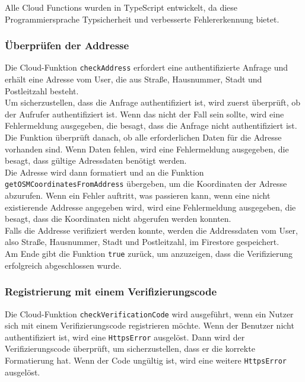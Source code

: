Alle Cloud Functions wurden in TypeScript entwickelt, da diese Programmiersprache Typsicherheit und verbesserte Fehlererkennung bietet.

\subsubsection{Überprüfen der Addresse}

Die Cloud-Funktion \texttt{checkAddress} erfordert eine authentifizierte Anfrage und erhält eine Adresse vom User, die aus Straße, Hausnummer, Stadt und Postleitzahl besteht.
\\
Um sicherzustellen, dass die Anfrage authentifiziert ist, wird zuerst überprüft, ob der Aufrufer authentifiziert ist. Wenn das nicht der Fall sein sollte, wird eine Fehlermeldung ausgegeben, die besagt, dass die Anfrage nicht authentifiziert ist.
\\
Die Funktion überprüft danach, ob alle erforderlichen Daten für die Adresse vorhanden sind. Wenn Daten fehlen, wird eine Fehlermeldung ausgegeben, die besagt, dass gültige Adressdaten benötigt werden.
\\
Die Adresse wird dann formatiert und an die Funktion \texttt{getOSMCoordinatesFromAddress} übergeben, um die Koordinaten der Adresse abzurufen. Wenn ein Fehler auftritt, was passieren kann, wenn eine nicht existierende Addresse angegeben wird, wird eine Fehlermeldung ausgegeben, die besagt, dass die Koordinaten nicht abgerufen werden konnten.
\\
Falls die Addresse verifiziert werden konnte, werden die Addressdaten vom User, also Straße, Hausnummer, Stadt und Postleitzahl, im Firestore gespeichert.
\\
Am Ende gibt die Funktion \texttt{true} zurück, um anzuzeigen, dass die Verifizierung erfolgreich abgeschlossen wurde.

\subsubsection{Registrierung mit einem Verifizierungscode}\label{subsec:registrierung-verify}

Die Cloud-Funktion \texttt{checkVerificationCode} wird ausgeführt, wenn ein Nutzer sich mit einem Verifizierungscode registrieren möchte. Wenn der Benutzer nicht authentifiziert ist, wird eine \texttt{HttpsError} ausgelöst. Dann wird der Verifizierungscode überprüft, um sicherzustellen, dass er die korrekte Formatierung hat. Wenn der Code ungültig ist, wird eine weitere \texttt{HttpsError} ausgelöst.

